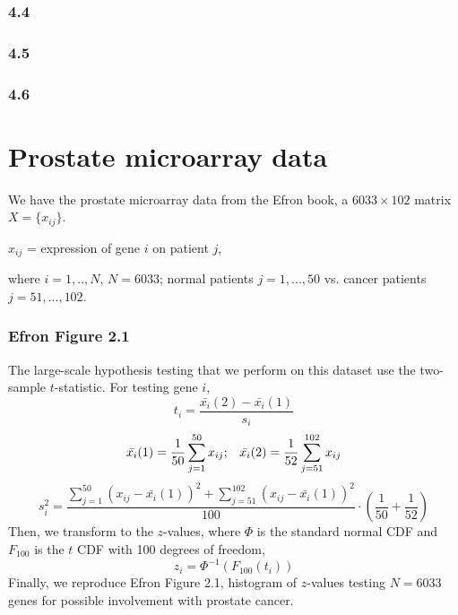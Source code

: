 \documentclass{article}
\begin{document}
\subsubsection*{4.4}



\subsubsection*{4.5}



\subsubsection*{4.6}







\newpage
\section*{Prostate microarray data}
\hspace{12 pt} We have the prostate microarray data from the Efron
book, a $6033 \times 102$ matrix $X=\{x_{ij}\}$.
\begin{center}
$x_{ij}$ = expression of gene $i$ on patient $j$, 
\end{center}
where $i=1,..,N$, $N=6033$; normal patients $j=1,...,50$ vs. cancer
patients $j=51,...,102$.


\subsubsection*{Efron Figure 2.1}
\hspace{12 pt} The large-scale hypothesis testing that we perform on
this dataset use the two-sample $t$-statistic. \newline
For testing gene $i$,
\begin{displaymath}
t_i = \frac{\bar{x_i}(2) - \bar{x_i}(1)}{s_i}
\end{displaymath}
\begin{displaymath}
\bar{x_i}(1) = \frac{1}{50} \sum_{j=1}^{50} x_{ij} ; \hspace{8 pt}
\bar{x_i}(2) = \frac{1}{52} \sum_{j=51}^{102} x_{ij}
\end{displaymath}
\begin{displaymath}
s_i^2 = \frac{\sum_{j=1}^{50} (x_{ij} - \bar{x_i}(1))^2 +
  \sum_{j=51}^{102} (x_{ij} - \bar{x_i}(1))^2 }{100} \cdot (\frac{1}{50} + \frac{1}{52}) 
\end{displaymath}
Then, we transform to the $z$-values, 
where $\Phi$ is the standard normal CDF and $F_{100}$ is the $t$ CDF
with 100 degrees of freedom,
\begin{displaymath}
z_i = \Phi^{-1}(F_{100}(t_i))
\end{displaymath}
Finally, we reproduce Efron
Figure 2.1, histogram of $z$-values testing $N=6033$ genes
for possible involvement with prostate cancer.
\end{document}
